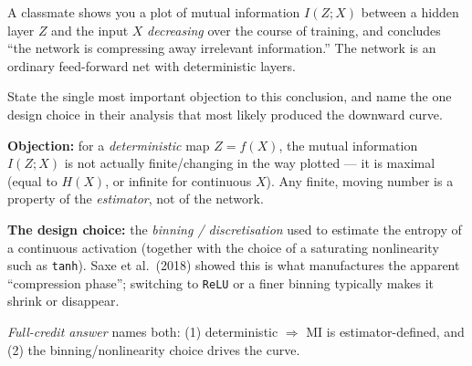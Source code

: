 \documentclass[11pt,letterpaper]{article}
\begin{document}

\begin{keybox}[Question]
A classmate shows you a plot of mutual information $I(Z;X)$ between a hidden layer
$Z$ and the input $X$ \emph{decreasing} over the course of training, and concludes
``the network is compressing away irrelevant information.'' The network is an
ordinary feed-forward net with deterministic layers.

State the single most important objection to this conclusion, and name the one
design choice in their analysis that most likely produced the downward curve.
\end{keybox}

\vspace{0.5em}
\begin{keybox}[Answer]
\textbf{Objection:} for a \emph{deterministic} map $Z=f(X)$, the mutual information
$I(Z;X)$ is not actually finite/changing in the way plotted --- it is maximal
(equal to $H(X)$, or infinite for continuous $X$). Any finite, moving number is a
property of the \emph{estimator}, not of the network.

\textbf{The design choice:} the \emph{binning / discretisation} used to estimate the
entropy of a continuous activation (together with the choice of a saturating
nonlinearity such as \texttt{tanh}). Saxe et al.\ (2018) showed this is what
manufactures the apparent ``compression phase''; switching to \texttt{ReLU} or a
finer binning typically makes it shrink or disappear.

\emph{Full-credit answer} names both: (1) deterministic $\Rightarrow$ MI is
estimator-defined, and (2) the binning/nonlinearity choice drives the curve.
\end{keybox}
\end{document}
